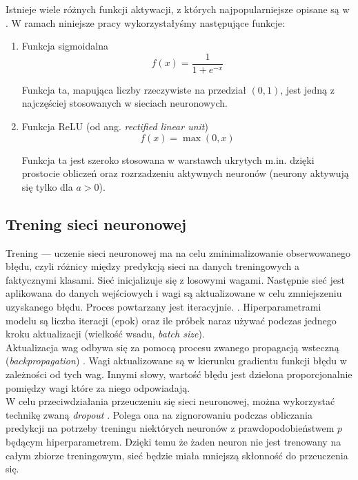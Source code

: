 \noindent Istnieje wiele różnych funkcji aktywacji, z których najpopularniejsze opisane są w \cite{sharma2017activation}. W ramach niniejsze pracy wykorzystałyśmy następujące funkcje:
\begin{enumerate}
	\item Funkcja sigmoidalna
	\begin{equation}
	f(x) = \frac{1}{1 + e^{-x}}
	\end{equation}
	
	Funkcja ta, mapująca liczby rzeczywiste na przedział $(0, 1)$, jest jedną z najczęściej stosowanych w sieciach neuronowych.
	
	\item Funkcja ReLU (od ang. \textit{rectified  linear  unit}) 
	\begin{equation}
	f(x) = \max(0,x)
	\end{equation}
	
	Funkcja ta jest szeroko stosowana w warstawch ukrytych m.in. dzięki prostocie obliczeń oraz rozrzadzeniu aktywnych neuronów (neurony aktywują się tylko dla $a > 0$).
	
\end{enumerate}

\subsection{Trening sieci neuronowej}

Trening --- uczenie sieci neuronowej ma na celu zminimalizowanie obserwowanego błędu, czyli różnicy między predykcją sieci na danych treningowych a faktycznymi klasami. Sieć inicjalizuje się z losowymi wagami. Następnie sieć jest aplikowana do danych wejściowych i wagi są aktualizowane w celu zmniejszeniu uzyskanego błędu. Proces powtarzany jest iteracyjnie. \cite{gurney2013introduction}. Hiperparametrami modelu są liczba iteracji (epok) oraz ile próbek naraz używać podczas jednego kroku aktualizacji (wielkość wsadu, \textit{batch size}).
\\Aktualizacja wag odbywa się za pomocą procesu zwanego propagacją wsteczną (\textit{backpropagation})  \cite{goodfellow2016deep}. Wagi aktualizowane są w kierunku gradientu funkcji błędu w zależności od tych wag. Innymi słowy, wartość błędu jest dzielona proporcjonalnie pomiędzy wagi które za niego odpowiadają.
\\W celu przeciwdziałania przeuczeniu się sieci neuronowej, można wykorzystać technikę zwaną \textit{dropout} \cite{srivastava2014dropout}. Polega ona na zignorowaniu podczas obliczania predykcji na potrzeby treningu niektórych neuronów z prawdopodobieństwem $p$ będącym hiperparametrem. Dzięki temu że żaden neuron nie jest trenowany na całym zbiorze treningowym, sieć będzie miała mniejszą skłonność do przeuczenia się.

